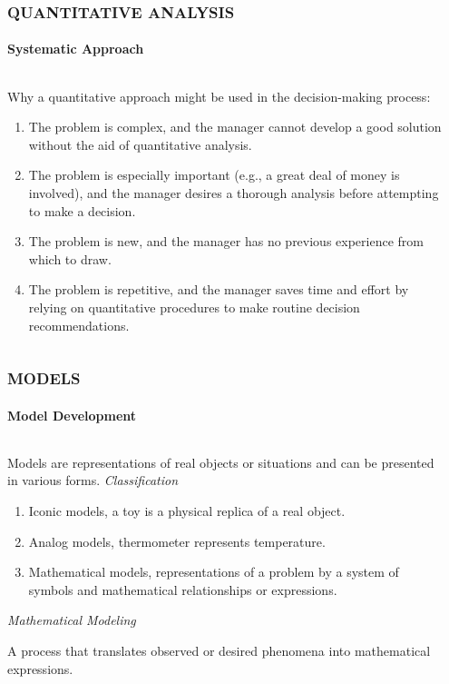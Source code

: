 \documentclass[14 pt]{beamer}
\begin{document}
\begin{frame}[t]
\frametitle{QUANTITATIVE ANALYSIS}
\framesubtitle{Systematic Approach}

\begin{columns}[t]
\begin{column}{0.45\textwidth}
Why a quantitative approach might be used in the decision-making process:

\begin{enumerate}
  \item The problem is complex, and the manager cannot develop a good solution without the aid of quantitative analysis.
  \item The problem is especially important (e.g., a great deal of money is involved), and the manager desires a thorough analysis before attempting to make a decision.
  \item The problem is new, and the manager has no previous experience from which to draw.
  \item The problem is repetitive, and the manager saves time and effort by relying on quantitative procedures to make routine decision recommendations.
\end{enumerate}

\end{column}

\begin{column}{0.45\textwidth}
\end{column}
\end{columns}
\end{frame}


\begin{frame}[t]
\frametitle{MODELS}
\framesubtitle{Model Development}

\begin{columns}[t]
\begin{column}{0.45\textwidth}
Models are representations of real objects or situations and can be presented in various forms.
\vskip0.5cm%
\emph{Classification}

\begin{enumerate}
  \item Iconic models, a toy is a physical replica of a real object. 
  \item Analog models, thermometer represents temperature.
  \item Mathematical models, representations of a problem by a system of symbols and mathematical relationships or expressions.
\end{enumerate}
\vskip0.5cm%
\emph{Mathematical Modeling}

A process that translates observed or desired phenomena into mathematical expressions.
\end{column}

\begin{column}{0.45\textwidth}

\end{column}
\end{columns}
\end{frame}
\end{document}
